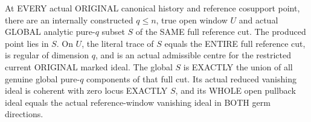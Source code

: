 \begin{theorem}
\label{hir:original-full-reference-pure-global-extension}
\leanok
At EVERY actual ORIGINAL canonical history and reference cosupport point,
there are an internally constructed $q\le n$, true open window $U$ and
actual GLOBAL analytic pure-$q$ subset $S$ of the SAME full reference cut.
The produced point lies in $S$. On $U$, the literal trace of $S$ equals the
ENTIRE full reference cut, is regular of dimension $q$, and is an actual
admissible centre for the restricted current ORIGINAL marked ideal. The
global $S$ is EXACTLY the union of all genuine global pure-$q$ components
of that full cut. Its actual reduced vanishing ideal is coherent with zero
locus EXACTLY $S$, and its WHOLE open pullback ideal equals the actual
reference-window vanishing ideal in BOTH germ directions.
\end{theorem}
